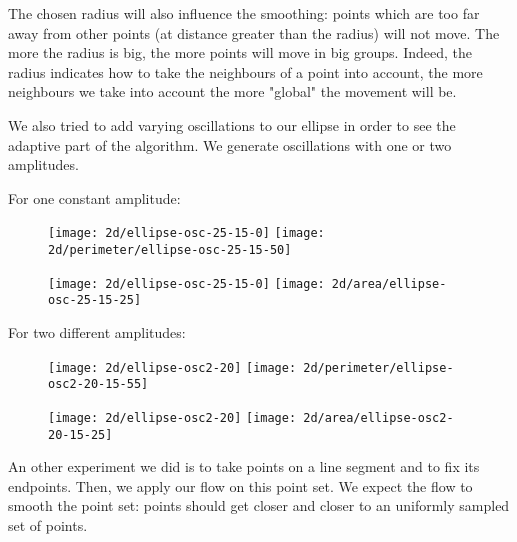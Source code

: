 The chosen radius will also influence the smoothing: points which are too far
away from other points (at distance greater than the radius) will not move. The
more the radius is big, the more points will move in big groups. Indeed, the
radius indicates how to take the neighbours of a point into account, the more
neighbours we take into account the more "global" the movement will be.

We also tried to add varying oscillations to our ellipse in order to see the
adaptive part of the algorithm. We generate oscillations with one or two
amplitudes.

For one constant amplitude:

\begin{figure}[H]
    \centering

    \texttt{[image: 2d/ellipse-osc-25-15-0]}
    \texttt{[image: 2d/perimeter/ellipse-osc-25-15-50]}
    \label{fig:ellipse_osc_perimeter_flow}

    \texttt{[image: 2d/ellipse-osc-25-15-0]}
    \texttt{[image: 2d/area/ellipse-osc-25-15-25]}
    \label{fig:ellipse_osc_area_flow}
\end{figure}

For two different amplitudes:

\begin{figure}[H]
    \centering

    \texttt{[image: 2d/ellipse-osc2-20]}
    \texttt{[image: 2d/perimeter/ellipse-osc2-20-15-55]}
    \label{fig:ellipse_osc2_perimeter_flow}

    \texttt{[image: 2d/ellipse-osc2-20]}
    \texttt{[image: 2d/area/ellipse-osc2-20-15-25]}
    \label{fig:ellipse_osc2_area_flow}
\end{figure}


An other experiment we did is to take points on a line segment and to fix its
endpoints. Then, we apply our flow on this point set. We expect the flow to
smooth the point set: points should get closer and closer to an uniformly
sampled set of points.

